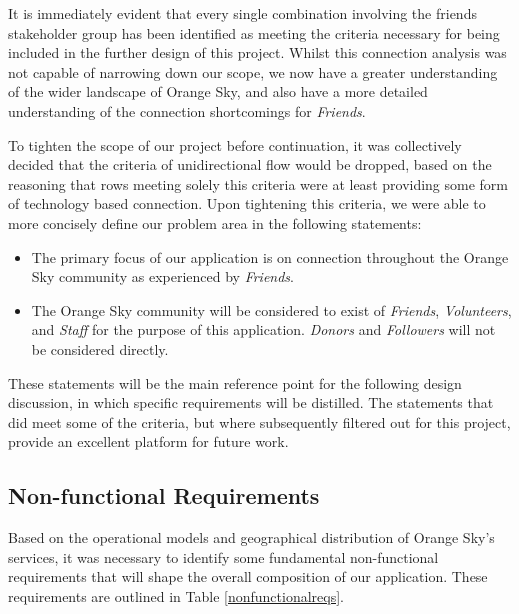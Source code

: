 It is immediately evident that every single combination involving the friends stakeholder group has been identified as meeting the criteria necessary for being included in the further design of this project. Whilst this connection analysis was not capable of narrowing down our scope, we now have a greater understanding of the wider landscape of Orange Sky, and also have a more detailed understanding of the connection shortcomings for \emph{Friends}.

To tighten the scope of our project before continuation, it was collectively decided that the criteria of unidirectional flow would be dropped, based on the reasoning that rows meeting solely this criteria were at least providing some form of technology based connection. Upon tightening this criteria, we were able to more concisely define our problem area in the following statements:

\begin{itemize}
    \item The primary focus of our application is on connection throughout the Orange Sky community as experienced by \emph{Friends}.
    \item The Orange Sky community will be considered to exist of \emph{Friends}, \emph{Volunteers}, and \emph{Staff} for the purpose of this application. \emph{Donors} and \emph{Followers} will not be considered directly.
\end{itemize}

These statements will be the main reference point for the following design discussion, in which specific requirements will be distilled. The statements that did meet some of the criteria, but where subsequently filtered out for this project, provide an excellent platform for future work.

\subsection{Non-functional Requirements}

Based on the operational models and geographical distribution of Orange Sky's services, it was necessary to identify some fundamental non-functional requirements that will shape the overall composition of our application. These requirements are outlined in Table \ref{nonfunctionalreqs}.

